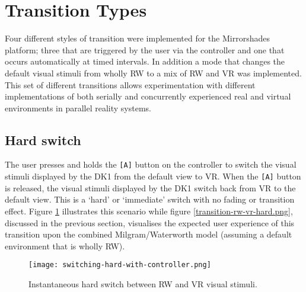 
\section{Transition Types}

Four different styles of transition were implemented for the Mirrorshades platform; three that are triggered by the user via the controller and one that occurs automatically at timed intervals. In addition a mode that changes the default visual stimuli from wholly RW to a mix of RW and VR was implemented. This set of different transitions allows experimentation with different implementations of both serially and concurrently experienced real and virtual environments in parallel reality systems.


\subsection{Hard switch}
\label{sub-hardswitch}
The user presses and holds the \texttt{[A]} button on the controller to switch the visual stimuli displayed by the DK1 from the default view to VR. When the \texttt{[A]} button is released, the visual stimuli displayed by the DK1 switch back from VR to the default view. This is a `hard' or `immediate' switch with no fading or transition effect. Figure \ref{scenario1} illustrates this scenario while figure \ref{transition-rw-vr-hard.png}, discussed in the previous section, visualises the expected user experience of this transition upon the combined Milgram/Waterworth model (assuming a default environment that is wholly RW).

\begin{figure}[h]
	\begin{center}
		\texttt{[image: switching-hard-with-controller.png]}
		\caption{Instantaneous hard switch between RW and VR visual stimuli.}
		\label{scenario1}
	\end{center}
\end{figure}


